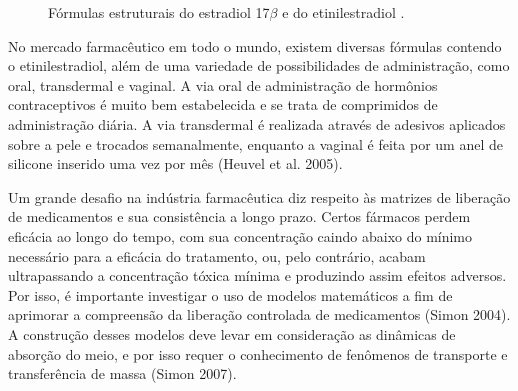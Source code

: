 \begin{figure}[!htb]
    \begin{center}
    \hfill
    \par
    \caption[Estradiol 17$\beta$ e etinilestradiol.]{Fórmulas estruturais do estradiol 17$\beta$  e do etinilestradiol .}
    \label{fig:structure}
    \end{center}
\end{figure}

No mercado farmacêutico em todo o mundo, existem diversas fórmulas contendo o etinilestradiol, além de uma variedade de possibilidades de administração, como oral, transdermal e vaginal. A via oral de administração de hormônios contraceptivos é muito bem estabelecida e se trata de comprimidos de administração diária. A via transdermal é realizada através de adesivos aplicados sobre a pele e trocados semanalmente, enquanto a vaginal é feita por um anel de silicone inserido uma vez por mês (Heuvel et al. 2005).

Um grande desafio na indústria farmacêutica diz respeito às matrizes de liberação de medicamentos e sua consistência a longo prazo. Certos fármacos perdem eficácia ao longo do tempo, com sua concentração caindo abaixo do mínimo necessário para a eficácia do tratamento, ou, pelo contrário, acabam ultrapassando a concentração tóxica mínima e produzindo assim efeitos adversos. Por isso, é importante investigar o uso de modelos matemáticos a fim de aprimorar a compreensão da liberação controlada de medicamentos (Simon 2004). A construção desses modelos deve levar em consideração as dinâmicas de absorção do meio, e por isso requer o conhecimento de fenômenos de transporte e transferência de massa (Simon 2007).

